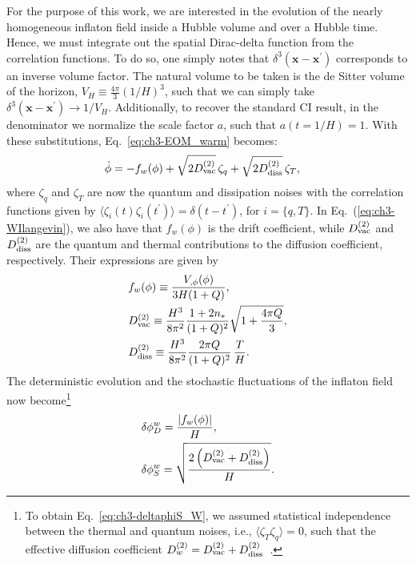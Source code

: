 For the purpose of this work, we are interested in the evolution of the nearly homogeneous
inflaton field inside a Hubble volume and over a Hubble time. Hence, we must integrate out the
spatial Dirac-delta function from the correlation functions. To do so,
one simply notes that $\delta^{3}(\mathbf{x}-\mathbf{x^\prime})$
corresponds to an inverse volume factor. The natural volume to be
taken is the de Sitter volume of the horizon, $V_H\equiv
\frac{4\pi}{3}\left(1/H\right)^3$, such that we can simply take
$\delta^{3}(\mathbf{x}-\mathbf{x^\prime})\rightarrow
1/V_H$. Additionally, to recover the standard CI result,
in the denominator we normalize the scale factor $a$, such that $a(t=1/H)=1$.  With these substitutions, Eq.~\ref{eq:ch3-EOM_warm} becomes:
%
\begin{align}
    \dot{\phi}&=-f_w(\phi)+\sqrt{2D^{(2)}_{\rm{vac}}}\,\zeta_q
    +\sqrt{2D^{(2)}_{\rm{diss}}}\,\zeta_T,
\label{eq:ch3-WIlangevin}
\end{align}
%
where $\zeta_q$ and $\zeta_T$ are now the quantum and dissipation
noises with the correlation functions  given by $\langle
\zeta_i(t)\zeta_i(t^\prime)\rangle= \delta(t-t^\prime)$, for $i=\{ q,
T\}$.  In Eq.~(\ref{eq:ch3-WIlangevin}), we also have that $f_w(\phi)$ is the
drift coefficient, while $D^{(2)}_{\rm{vac}}$ and
$D^{(2)}_{\rm{diss}}$ are the quantum and thermal contributions to the
diffusion coefficient, respectively.  Their expressions are given by
%
\begin{align}
  &f_w(\phi)\equiv\frac{V_{,\phi}(\phi)}{3H(1+Q)}, \label{eq:ch3-driftC_warm}
  \\
  &D^{(2)}_{\rm{vac}}\equiv\frac{H^{3}}{8\pi^2}\frac{1+2n_*}{(1+Q)^2}
  \sqrt{1+\frac{4\pi
      Q}{3}},
\label{eq:ch3-diffusionC_warmq}
\\ & D^{(2)}_{\rm{diss}}\equiv \frac{H^{3}}{8\pi^2} \frac{2\pi
  Q}{(1+Q)^2} \,\frac{T}{H}. \label{eq:ch3-diffusionC_warmT}
\end{align}
%
The deterministic evolution and the stochastic fluctuations of the
inflaton field now become\footnote{To obtain
Eq.~\ref{eq:ch3-deltaphiS_W}, we assumed statistical independence
between the thermal and quantum noises, i.e.,
$\langle\zeta_T\zeta_q\rangle=0$, such that the effective diffusion
coefficient
$D^{(2)}_w=D^{(2)}_{\rm{vac}}+D^{(2)}_{\rm{diss}}$~\cite{Ramos:2013nsa}.}
%
\begin{align}
  &\delta\phi^{w}_D=\frac{|f_w(\phi)|}{H},\label{eq:ch3-deltaphiD_W}
  \\
  &\delta\phi^{w}_S=\sqrt{\frac{2\left(D^{(2)}_{\rm{vac}}+D^{(2)}_{\rm{diss}}
      \right)}{H}}. \label{eq:ch3-deltaphiS_W}
\end{align}

